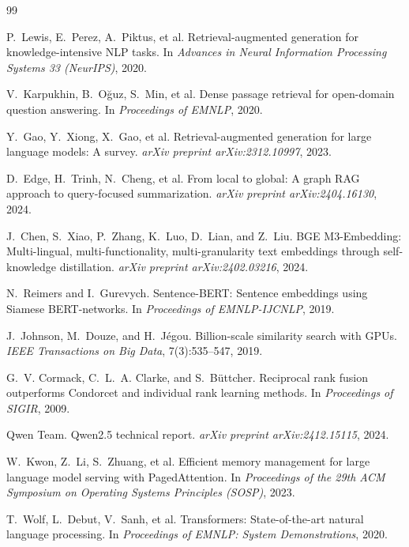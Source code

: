 \documentclass[pdflatex,sn-mathphys-num]{sn-jnl}
\begin{document}
\begin{thebibliography}{99}\setlength{\itemsep}{2pt}

P.~Lewis, E.~Perez, A.~Piktus, et al.
\newblock Retrieval-augmented generation for knowledge-intensive NLP tasks.
\newblock In \emph{Advances in Neural Information Processing Systems 33
(NeurIPS)}, 2020.

V.~Karpukhin, B.~O\u{g}uz, S.~Min, et al.
\newblock Dense passage retrieval for open-domain question answering.
\newblock In \emph{Proceedings of EMNLP}, 2020.

Y.~Gao, Y.~Xiong, X.~Gao, et al.
\newblock Retrieval-augmented generation for large language models: A survey.
\newblock \emph{arXiv preprint arXiv:2312.10997}, 2023.

D.~Edge, H.~Trinh, N.~Cheng, et al.
\newblock From local to global: A graph RAG approach to query-focused
summarization.
\newblock \emph{arXiv preprint arXiv:2404.16130}, 2024.

J.~Chen, S.~Xiao, P.~Zhang, K.~Luo, D.~Lian, and Z.~Liu.
\newblock BGE M3-Embedding: Multi-lingual, multi-functionality,
multi-granularity text embeddings through self-knowledge distillation.
\newblock \emph{arXiv preprint arXiv:2402.03216}, 2024.

N.~Reimers and I.~Gurevych.
\newblock Sentence-BERT: Sentence embeddings using Siamese BERT-networks.
\newblock In \emph{Proceedings of EMNLP-IJCNLP}, 2019.

J.~Johnson, M.~Douze, and H.~J\'egou.
\newblock Billion-scale similarity search with GPUs.
\newblock \emph{IEEE Transactions on Big Data}, 7(3):535--547, 2019.

G.~V. Cormack, C.~L.~A. Clarke, and S.~B\"uttcher.
\newblock Reciprocal rank fusion outperforms Condorcet and individual rank
learning methods.
\newblock In \emph{Proceedings of SIGIR}, 2009.

Qwen Team.
\newblock Qwen2.5 technical report.
\newblock \emph{arXiv preprint arXiv:2412.15115}, 2024.

W.~Kwon, Z.~Li, S.~Zhuang, et al.
\newblock Efficient memory management for large language model serving with
PagedAttention.
\newblock In \emph{Proceedings of the 29th ACM Symposium on Operating Systems
Principles (SOSP)}, 2023.

T.~Wolf, L.~Debut, V.~Sanh, et al.
\newblock Transformers: State-of-the-art natural language processing.
\newblock In \emph{Proceedings of EMNLP: System Demonstrations}, 2020.


\end{thebibliography}
\end{document}
